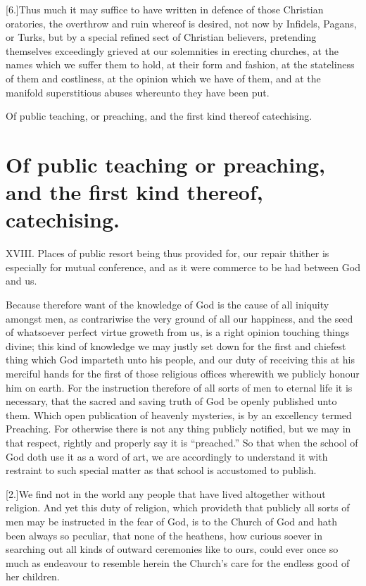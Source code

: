 [6.]Thus much it may suffice to have written in defence of those Christian oratories, the overthrow and ruin whereof is desired, not now by Infidels, Pagans, or Turks, but by a special refined sect of Christian believers, pretending themselves exceedingly grieved at our solemnities in erecting churches, at the names which we suffer them to hold, at their form and fashion, at the stateliness of them and costliness, at the opinion which we have of them, and at the manifold superstitious abuses whereunto they have been put.


Of public teaching, or preaching, and the first kind thereof catechising.
\section*{Of public teaching or preaching, and the first kind thereof, catechising.}
XVIII. Places of public resort being thus provided for, our repair thither is especially for mutual conference, and as it were commerce to be had between God and us.

Because therefore want of the knowledge of God is the cause of all iniquity amongst men, as contrariwise the very ground of all our happiness, and the seed of whatsoever  perfect virtue groweth from us,
 is a right opinion touching things divine; this kind of knowledge we may justly set down for the first and chiefest thing which God imparteth unto his people, and our duty of receiving this at his merciful hands for the first of those religious offices wherewith we publicly honour him on earth. For the instruction therefore of all sorts of men to eternal life it is necessary, that the sacred and saving truth of God be openly published unto them. Which open publication of heavenly mysteries, is by an excellency termed Preaching. For otherwise there is not any thing publicly notified, but we may in that respect, rightly and properly say it is “preached.” So that when the school of God doth use it as a word of art, we are accordingly to understand it with restraint to such special matter as that school is accustomed to publish.

[2.]We find not in the world any people that have lived altogether without religion. And yet this duty of religion, which provideth that publicly all sorts of men may be instructed in the fear of God, is to the Church of God and hath been always so peculiar, that none of the heathens, how curious soever in searching out all kinds of outward ceremonies like to ours, could ever once so much as endeavour to resemble herein the Church’s care for the endless good of her children.

